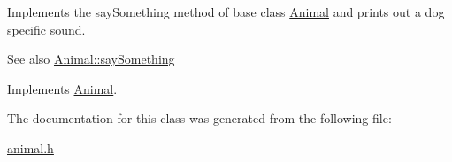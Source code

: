 Implements the say\+Something method of base class \hyperlink{classAnimal}{Animal} and prints out a dog specific sound.

\begin{DoxySeeAlso}{See also}
\hyperlink{classAnimal_a1da8e52d19af5bd43a3755d9d5454598}{Animal\+::say\+Something} 
\end{DoxySeeAlso}


Implements \hyperlink{classAnimal_a1da8e52d19af5bd43a3755d9d5454598}{Animal}.



The documentation for this class was generated from the following file\+:\begin{DoxyCompactItemize}
\item 
\hyperlink{animal_8h}{animal.\+h}\end{DoxyCompactItemize}
